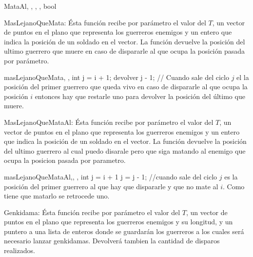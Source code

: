 		\begin{algoritmo}{MataAl}{, , , ,  }{bool}

		\end{algoritmo}
		
		MasLejanoQueMata:
		Ésta función recibe por parámetro el valor del $T$, un vector de puntos en el plano que representa los guerreros enemigos y un entero que indica la posición de un soldado en el vector.
		La función devuelve la posición del ultimo guerrero que muere en caso de dispararle al que ocupa la posición pasada por parámetro.\\

		\begin{algoritmo}{masLejanoQueMata}{, , }{int}
			j = i + 1;\;
  			devolver j - 1; // Cuando sale del ciclo $j$ el la posición del primer guerrero que queda vivo en caso de dispararle al que ocupa la posición $i$ entonces hay que restarle uno para devolver la posición del último que muere.\;
		\end{algoritmo}

		
		MasLejanoQueMataAl:
		Ésta función recibe por parámetro el valor del $T$,  un vector de puntos en el plano que representa los guerreros enemigos y un entero que indica la posición de un soldado en el vector.
		La función devuelve la posición del ultimo guerrero al cual puedo disarale pero que siga matando al enemigo que ocupa la posicion pasada por parametro.\\ 

	\begin{algoritmo}{masLejanoQueMataAl}{,, , }{int}
		j = i + 1 \;
  		j = j - 1;\; //cuando sale del ciclo $j$ es la posición del primer guerrero al que hay que dispararle y que no mate al $i$. Como tiene que matarlo se retrocede uno. 

	\end{algoritmo} \;

		
		Genkidama:
		Ésta función recibe por parámetro el valor del $T$,  un vector de puntos en el plano que representa los guerreros enemigos y su longitud, y un puntero a una lista de enteros donde se guardarán los guerreros a los cuales será necesario lanzar genkidamas. Devolverá tambien la cantidad de disparos realizados. \\

